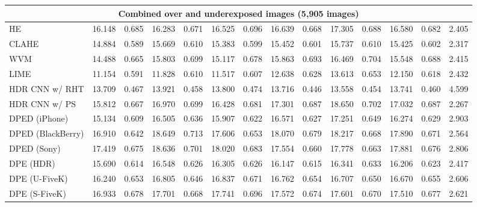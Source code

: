 \documentclass[final]{cvpr}
\begin{document}
\begin{table*}
\begin{center}
{\begin{tabular}{|l|c|c|c|c|c|c|c|c|c|c|c|c|c|}
\multicolumn{14}{|c|}{\cellcolor[HTML]{CCECEB}Combined over and underexposed images (5,905 images)}\\ \hline
HE \cite{10.5555/559707} & 16.148 & \cellcolor[HTML]{FFCCCB}0.685 & 16.283 & 0.671 & 16.525 & \cellcolor[HTML]{FFCCCB}0.696  & 16.639 & 0.668 & 17.305 & 0.688 & 16.580 & 0.682 & 2.405\\
CLAHE \cite{adaptivehisteq} & 14.884 & 0.589 & 15.669 &  0.610 & 15.383 & 0.599 & 15.452 & 0.601 & 15.737 & 0.610 & 15.425 & 0.602 & 2.317\\
WVM \cite{fu2016weighted} &  14.488 & 0.665 & 15.803 & \cellcolor[HTML]{FFCCCB}0.699 & 15.117 & 0.678 & 15.863 & \cellcolor[HTML]{FFCCCB}0.693 & 16.469 & \cellcolor[HTML]{FFCCCB}0.704 & 15.548 & 0.688 & 2.415\\
\cellcolor[HTML]{D5D5D5}LIME \cite{guo2016lime, guo2017lime} & 11.154 & 0.591 & 11.828 & 0.610 & 11.517 & 0.607 & 12.638 & 0.628 & 13.613 & 0.653 & 12.150 & 0.618 & 2.432\\
HDR CNN \cite{HDRCNN} w/ RHT \cite{yang2018image}& 13.709 & 0.467 & 13.921 & 0.458 & 13.800 & 0.474 & 13.716 & 0.446 & 13.558 & 0.454 & 13.741 & 0.460 & 4.599\\
HDR CNN \cite{HDRCNN} w/ PS \cite{dayley2010photoshop}  & 15.812 & 0.667 & 16.970 & 0.699 & 16.428 & 0.681 & 17.301 & 0.687 & 18.650  & 0.702 & 17.032 & \cellcolor[HTML]{FFCCCB}0.687 & \cellcolor[HTML]{FFCCCB}2.267\\
DPED (iPhone) \cite{DPED}& 15.134 & 0.609 & 16.505 & 0.636 & 15.907 & 0.622 & 16.571 & 0.627 & 17.251 & 0.649 & 16.274 & 0.629 & 2.903\\
DPED (BlackBerry) \cite{DPED} & 16.910 & 0.642 & \cellcolor[HTML]{FFCCCB}18.649 & \cellcolor[HTML]{FFCCCB}0.713 & 17.606 & 0.653 & \cellcolor[HTML]{FFCCCB}18.070 & 0.679 & 18.217 & 0.668 & \cellcolor[HTML]{FFCCCB}17.890 & 0.671 & 2.564\\
DPED (Sony) \cite{DPED}& \cellcolor[HTML]{FFCCCB}17.419  & 0.675 & 18.636 & 0.701 & \cellcolor[HTML]{FFCCCB}18.020  & 0.683 &  17.554 & 0.660 & \cellcolor[HTML]{FFCCCB}17.778 & 0.663 & 17.881 & 0.676 & 2.806\\
DPE (HDR) \cite{DPE} & 15.690 & 0.614 & 16.548 & 0.626 & 16.305 & 0.626 & 16.147 & 0.615 & 16.341 & 0.633 & 16.206 & 0.623 & 2.417\\
DPE (U-FiveK) \cite{DPE} & 16.240 & 0.653 & 16.805 & 0.646 & 16.837 & 0.671 &  16.762 & 0.654 & 16.707 & 0.650 & 16.670 & 0.655 & 2.606\\
DPE (S-FiveK) \cite{DPE} & 16.933 & 0.678 & 17.701 & 0.668 & 17.741 & \cellcolor[HTML]{FFCCCB}0.696 & 17.572 & 0.674 & 17.601 & 0.670 & 17.510 & 0.677 & 2.621\\

\end{tabular}}
\end{center}
\end{table*}
\end{document}
